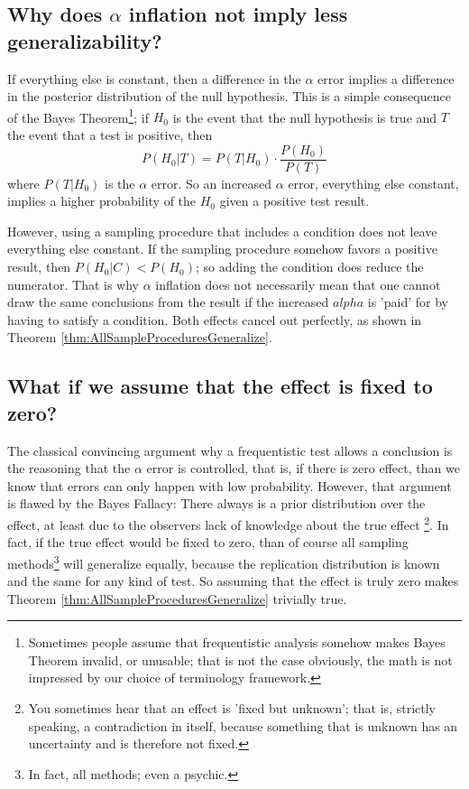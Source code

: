 \documentclass[man]{apa7}
\theoremstyle{definition}
\begin{document}
\subsection{Why does $\alpha$ inflation not imply less generalizability?}
If everything else is constant, then a difference in the $\alpha$ error implies a difference in the posterior distribution of the null hypothesis. This is a simple consequence of the Bayes Theorem\footnote{Sometimes people assume that frequentistic analysis somehow makes Bayes Theorem invalid, or unusable; that is not the case obviously, the math is not impressed by our choice of terminology framework.}; if $H_0$ is the event that the null hypothesis is true and $T$ the event that a test is positive, then
\[ P(H_0|T) = P(T|H_0) \cdot \frac{P(H_0)}{P(T)} \]
where $P(T|H_0)$ is the $\alpha$ error. So an increased $\alpha$ error, everything else constant, implies a higher probability of the $H_0$ given a positive test result.

However, using a sampling procedure that includes a condition does not leave everything else constant. If the sampling procedure somehow favors a positive result, then $P(H_0|C) < P(H_0)$; so adding the condition does reduce the numerator. That is why $\alpha$ inflation does not necessarily mean that one cannot draw the same conclusions from the result if the increased $alpha$ is 'paid' for by having to satisfy a condition. Both effects cancel out perfectly, as shown in Theorem \ref{thm:AllSampleProceduresGeneralize}.

\subsection{What if we assume that the effect is fixed to zero?}
The classical convincing argument why a frequentistic test allows a conclusion is the reasoning that the $\alpha$ error is controlled, that is, if there is zero effect, than we know that errors can only happen with low probability. However, that argument is flawed by the Bayes Fallacy: There always is a prior distribution over the effect, at least due to the observers lack of knowledge about the true effect \footnote{You sometimes hear that an effect is 'fixed but unknown'; that is, strictly speaking, a contradiction in itself, because something that is unknown has an uncertainty and is therefore not fixed.}. In fact, if the true effect would be fixed to zero, than of course all sampling methods\footnote{In fact, all methods; even a psychic.} will generalize equally, because the replication distribution is known and the same for any kind of test. So assuming that the effect is truly zero makes Theorem \ref{thm:AllSampleProceduresGeneralize} trivially true.
\end{document}
